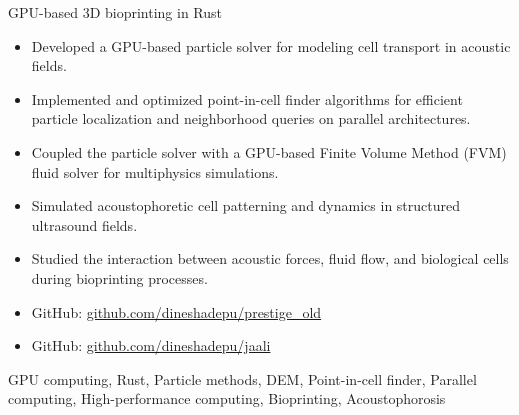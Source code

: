 \begin{experiences}
  \emptySeparator
  \experience
  {} {GPU-based 3D bioprinting in Rust}{}{}
  {}    {
    \begin{itemize}
    \item Developed a GPU-based particle solver for modeling cell transport in acoustic fields.
    \item Implemented and optimized point-in-cell finder algorithms for efficient particle localization and neighborhood queries on parallel architectures.
    \item Coupled the particle solver with a GPU-based Finite Volume Method (FVM) fluid solver for multiphysics simulations.
    \item Simulated acoustophoretic cell patterning and dynamics in structured ultrasound fields.
    \item Studied the interaction between acoustic forces, fluid flow, and biological cells during bioprinting processes.
    \item GitHub: \href{https://github.com/dineshadepu/prestige_old}{github.com/dineshadepu/prestige\_old}
    \item GitHub: \href{https://github.com/dineshadepu/jaali/}{github.com/dineshadepu/jaali}
    \end{itemize}
  }
  {GPU computing, Rust, Particle methods, DEM, Point-in-cell finder, Parallel computing, High-performance computing, Bioprinting, Acoustophorosis}
\end{experiences}
